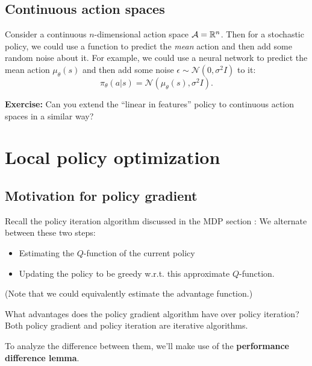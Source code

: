 \documentclass[\main/main]{subfiles}
\begin{document}
\subsection{Continuous action spaces}

Consider a continuous $n$-dimensional action space $\mathcal{A} = \mathbb{R}^n$. Then for a stochastic policy, we could use a function to predict the \emph{mean} action and then add some random noise about it. For example, we could use a neural network to predict the mean action $\mu_\theta(s)$ and then add some noise $\epsilon \sim \mathcal{N}(0, \sigma^2 I)$ to it: \[
    \pi_\theta(a|s) = \mathcal{N}(\mu_\theta(s), \sigma^2 I).
\]

\textbf{Exercise:} Can you extend the ``linear in features'' policy to continuous action spaces in a similar way?

\section{Local policy optimization}

\subsection{Motivation for policy gradient}

Recall the policy iteration algorithm discussed in the MDP section : We alternate between these two steps:

\begin{itemize}
    \item Estimating the $Q$-function of the current policy
    \item Updating the policy to be greedy w.r.t. this approximate $Q$-function.
\end{itemize}

(Note that we could equivalently estimate the advantage function.)

What advantages does the policy gradient algorithm have over policy iteration? Both policy gradient and policy iteration are iterative algorithms.

To analyze the difference between them, we'll make use of the \textbf{performance difference lemma}.
\end{document}
